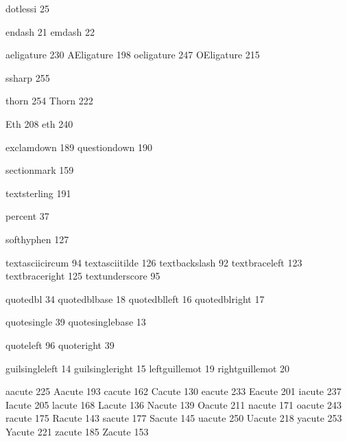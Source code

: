  dotlessi         25

 endash           21
 emdash           22

 aeligature      230
 AEligature      198
 oeligature      247
 OEligature      215

 ssharp          255

 thorn           254
 Thorn           222

 Eth             208
 eth             240

 exclamdown      189 %
 questiondown    190 %

 sectionmark     159

 textsterling    191

 percent          37

 softhyphen      127 %

 textasciicircum  94
 textasciitilde  126
 textbackslash    92
 textbraceleft   123
 textbraceright  125
 textunderscore   95

 quotedbl         34
 quotedblbase     18
 quotedblleft     16
 quotedblright    17

 quotesingle      39 %
 quotesinglebase  13

 quoteleft        96
 quoteright       39

 guilsingleleft   14
 guilsingleright  15
 leftguillemot    19
 rightguillemot   20

 aacute          225
 Aacute          193
 cacute          162
 Cacute          130
 eacute          233
 Eacute          201
 iacute          237
 Iacute          205
 lacute          168
 Lacute          136
 Nacute          139
 Oacute          211
 nacute          171
 oacute          243
 racute          175
 Racute          143
 sacute          177
 Sacute          145
 uacute          250
 Uacute          218
 yacute          253
 Yacute          221
 zacute          185
 Zacute          153

